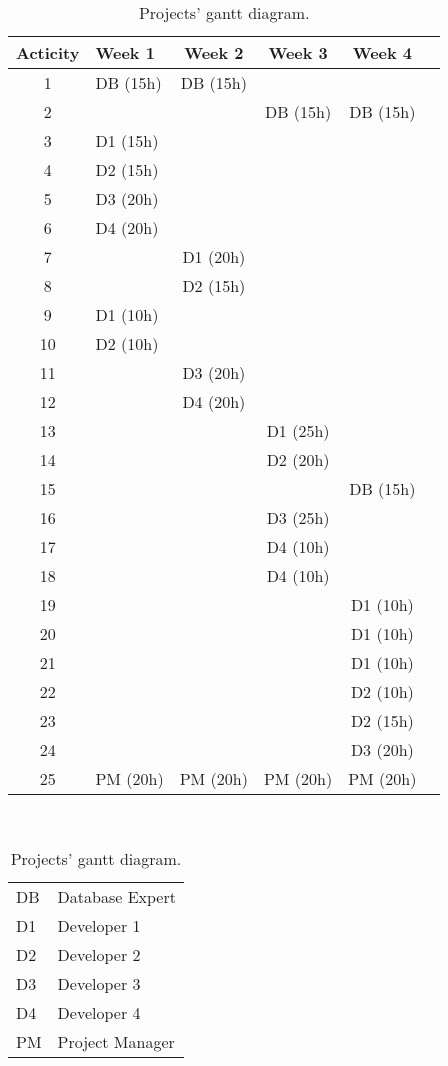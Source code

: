 \begin{table}
    \centering
	\begin{tabular}{|c|l|c|c|c|c|}
	\hline
	\textbf{Acticity}& \textbf{Week 1}& \textbf{Week 2}& \textbf{Week 3}& \textbf{Week 4}\\ \hline
	1 & DB (15h) & DB (15h) & & \\ 
	2 & & & DB (15h) & DB (15h)\\ 
	3 & D1 (15h) & & & \\ 
	4 & D2 (15h) & & & \\ 
	5 & D3 (20h) & & & \\ 
	6 & D4 (20h) & & & \\ 
	7 & & D1 (20h) & & \\ 
	8 & & D2 (15h) & & \\ 
	9 & D1 (10h) & & & \\ 
	10 & D2 (10h) & & & \\ 
	11 & & D3 (20h) & & \\ 
	12 & & D4 (20h) & & \\ 
	13 & & & D1 (25h) & \\ 
	14 & & & D2 (20h) & \\ 
	15 & & & & DB (15h) \\ 
	16 & & & D3 (25h) & \\
	17 & & & D4 (10h) & \\ 
	18 & & & D4 (10h) & \\ 
	19 & & & & D1 (10h) \\ 
	20 & & & & D1 (10h) \\ 
	21 & & & & D1 (10h) \\ 
	22 & & & & D2 (10h) \\ 
	23 & & & & D2 (15h) \\ 
	24 & & & & D3 (20h) \\ 
	25 & PM (20h) & PM (20h) & PM (20h) & PM (20h) \\ \hline
	\end{tabular}
\caption {Projects' gantt diagram.}
\mbox{}\\
 \centering
	\begin{tabular}{l l}
	DB & Database Expert\\
	D1 & Developer 1\\
	D2 & Developer 2\\
	D3 & Developer 3\\
	D4 & Developer 4\\
	PM & Project Manager\\
	\end{tabular}

\end{table}